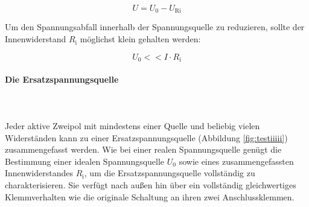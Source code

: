 \begin{frame}
{	\begin{equation*}
		U = U_0 - U_\mathrm{Ri}
	\end{equation*}

	Um den Spannungsabfall innerhalb der Spannungsquelle zu reduzieren, sollte der 
	Innenwiderstand $R_\mathrm{i}$ möglichst klein gehalten werden:

	\begin{equation*}
		U_0 << I \cdot R_\mathrm{i}
	\end{equation*}



\paragraph{Die Ersatzspannungsquelle}\\

\phantom{text}\\



	Jeder aktive Zweipol mit mindestens einer Quelle und beliebig vielen Widerständen kann zu einer
	Ersatzspannungsquelle (Abbildung \ref{fig:testiiiii}) zusammengefasst werden. Wie bei einer realen Spannungsquelle genügt die Bestimmung einer
	idealen Spannungsquelle $U_0$ sowie eines zusammengefassten Innenwiderstandes $R_\mathrm{i}$, um die 
	Ersatzspannungsquelle vollständig zu charakterisieren.
	Sie verfügt nach außen hin über ein vollständig gleichwertiges Klemmverhalten wie die originale Schaltung an
	ihren zwei Anschlussklemmen.


	\begin{figure}[h!]

		\begin{center}
		

\end{center}
\end{figure}}
\end{frame}
